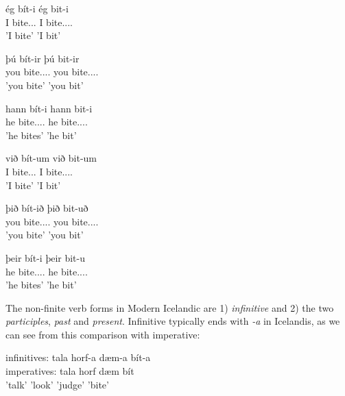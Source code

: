 \documentclass[12pt,%
    times,
]{lin-v2/lin}
\begin{document}
\begin{exe}
    \ex \begin{xlist}
        \item \gll ég bít-i ég bit-i\\
                   I bite.\First\Sg.\Prs.\Subj{} I bite.\First.\Sg.\Pst.\Subj\\
              \trans 'I bite' 'I bit'
        \item \gll þú bít-ir þú bit-ir\\
                   you bite.\Second.\Sg.\Prs.\Subj{} you bite.\Second.\Sg.\Pst.\Subj\\
              \trans 'you bite' 'you bit'
        \item \gll hann bít-i hann bit-i\\
                   he bite.\Third.\Sg.\Prs.\Subj{} he bite.\Third.\Sg.\Pst.\Subj\\
              \trans 'he bites' 'he bit'
        \item \gll við bít-um við bit-um\\
                   I bite.\First\Pl.\Prs.\Subj{} I bite.\First.\Pl.\Pst.\Subj\\
              \trans 'I bite' 'I bit'
        \item \gll þið bít-ið þið bit-uð\\
                   you bite.\Second.\Pl.\Prs.\Subj{} you bite.\Second.\Pl.\Pst.\Subj\\
              \trans 'you bite' 'you bit'
        \item \gll þeir bít-i þeir bit-u\\
                   he bite.\Third.\Pl.\Prs.\Subj{} he bite.\Third.\Pl.\Pst.\Subj\\
              \trans 'he bites' 'he bit'
        \end{xlist}
\end{exe}

The non-finite verb forms in Modern Icelandic are 1) \emph{infinitive} and 2) the two \emph{participles},
\emph{past} and \emph{present}. Infinitive typically ends with \emph{-a} in Icelandis,
as we can see from this comparison with imperative:
\begin{exe}
    \ex
    \gll infinitives: tala horf-a dæm-a bít-a\\
    imperatives: tala horf dæm bít\\
    \trans {~~~~~~~~~~~~~~~~~~~} 'talk' 'look' 'judge' 'bite'
\end{exe}
\end{document}

